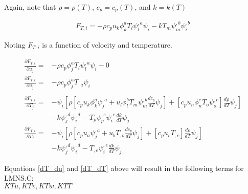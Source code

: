 Again, note that $\rho = \rho(T)$, $c_p = c_p(T)$, and $k = k(T)$

\begin{align}
    F_{T,i} = -\rho c_p u_k \phi_k^a T_l \psi_l^{,a} \psi_i - k T_m \psi_m^{,b} \psi_i^{,b}
\end{align}

Noting $F_{T,i}$ is a function of velocity and temperature.

\begin{align}
    \frac{\partial F_{T,i}}{\partial u_j} = &-\rho c_p \phi_j^a T_l \psi_l^{,a} \psi_i - 0 \nonumber \\
    \frac{\partial F_{T,i}}{\partial u_j} = &-\rho c_p \phi_j^a T_{,a} \psi_i \label{dT_du} \\
    \nonumber \\
    \frac{\partial F_{T,i}}{\partial T_j} = &-\psi_i \left [ \rho [ c_p u_k \phi_k^a \psi_j^{,a} + u_l \phi_l^b T_m \psi_m^{,b} \frac{d c_p}{dT} \psi_j ] + 
    [ c_p u_n \phi_n^{c} T_o \psi_o^{,c} ] \frac{d \rho}{dT} \psi_j  \right ] \nonumber \\
                                      &- k \psi_j^{,d} \psi_i^{,d} - T_p \psi_p^{,e} \psi_i^{,e} \frac{dk}{dT} \psi_j \nonumber \\
    \frac{\partial F_{T,i}}{\partial T_j} = &-\psi_i \left [ \rho [ c_p u_a \psi_j^{,a} + u_b T_{,b} \frac{d c_p}{dT} \psi_j ] + 
    [ c_p u_c T_{,c} ] \frac{d \rho}{dT} \psi_j  \right ] \nonumber \\
                                      &- k \psi_j^{,d} \psi_i^{,d} - T_{,e} \psi_i^{,e} \frac{dk}{dT} \psi_j \label{dT_dT}
\end{align}

Equations \ref{dT_du} and \ref{dT_dT} above will result in the following terms for LMNS.C:\\
$KTu, KTv, KTw, KTT$



